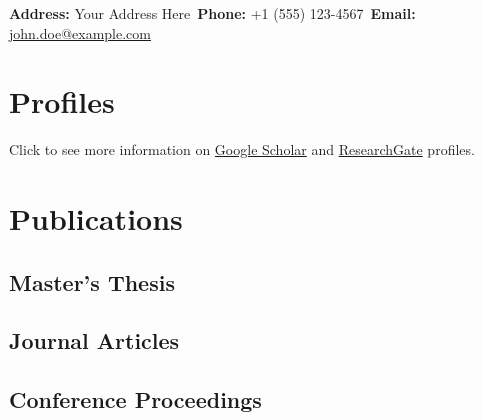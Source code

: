 \documentclass[a4paper,12pt]{article} %
\begin{document}

\vspace{12pt}

\noindent \textbf{Address:} Your Address Here\
\noindent \textbf{Phone:} +1 (555) 123-4567\
\noindent \textbf{Email:} \href{mailto:john.doe@example.com}{john.doe@example.com}

\section*{Profiles}
Click to see more information on \href{https://scholar.google.com/citations?user=5hyZ0wsAAAAJhl\&user=5hyZ0wsAAAAJ}{Google Scholar} and \href{https://www.researchgate.net/profile/Bekir-Bakar}{ResearchGate} profiles.

\section*{Publications}
\subsection*{Master's Thesis}
\begin{refsection}
    \nocite{bakar2018mastertshesis}
    \printbibliography[type=thesis,heading=none]
\end{refsection}

\subsection*{Journal Articles}
\begin{refsection}
    \nocite{yayik2022deep}
    \printbibliography[type=article,heading=none]
\end{refsection}

\subsection*{Conference Proceedings}
\begin{refsection}
    \nocite{bakar2020turkish, bakar2018experimental, bakar2018replay}
    \printbibliography[type=inproceedings,heading=none]
\end{refsection}
\end{document}
